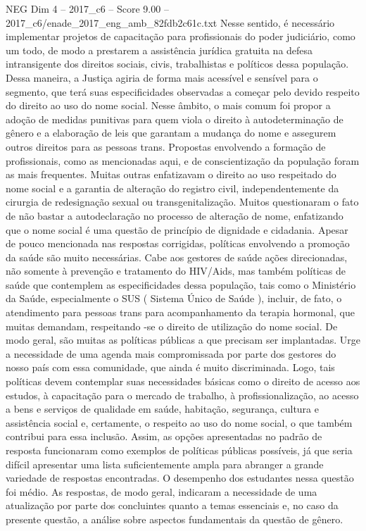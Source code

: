 \begin{textsample}{NEG Dim 4 – 2017\_c6 – Score 9.00 – 2017\_c6/enade\_2017\_eng\_amb\_82fdb2c61c.txt}
Nesse sentido, é necessário implementar projetos de capacitação para profissionais do poder judiciário, como um todo, de modo a prestarem a assistência jurídica gratuita na defesa intransigente dos direitos sociais, civis, trabalhistas e políticos dessa população.
Dessa maneira, a Justiça agiria de forma mais acessível e sensível para o segmento, que terá suas especificidades observadas a começar pelo devido respeito do direito ao uso do nome social.
Nesse âmbito, o mais comum foi propor a adoção de medidas punitivas para quem viola o direito à autodeterminação de gênero e a elaboração de leis que garantam a mudança do nome e assegurem outros direitos para as pessoas trans.
Propostas envolvendo a formação de profissionais, como as mencionadas aqui, e de conscientização da população foram as mais frequentes.
Muitas outras enfatizavam o direito ao uso respeitado do nome social e a garantia de alteração do registro civil, independentemente da cirurgia de redesignação sexual ou transgenitalização.
Muitos questionaram o fato de não bastar a autodeclaração no processo de alteração de nome, enfatizando que o nome social é uma questão de princípio de dignidade e cidadania.
Apesar de pouco mencionada nas respostas corrigidas, políticas envolvendo a promoção da saúde são muito necessárias.
Cabe aos gestores de saúde ações direcionadas, não somente à prevenção e tratamento do HIV/Aids, mas também políticas de saúde que contemplem as especificidades dessa população, tais como o Ministério da Saúde, especialmente o SUS ( Sistema Único de Saúde ), incluir, de fato, o atendimento para pessoas trans para acompanhamento da terapia hormonal, que muitas demandam, respeitando -se o direito de utilização do nome social.
De modo geral, são muitas as políticas públicas a que precisam ser implantadas.
Urge a necessidade de uma agenda mais compromissada por parte dos gestores do nosso país com essa comunidade, que ainda é muito discriminada.
Logo, tais políticas devem contemplar suas necessidades básicas como o direito de acesso aos estudos, à capacitação para o mercado de trabalho, à profissionalização, ao acesso a bens e serviços de qualidade em saúde, habitação, segurança, cultura e assistência social e, certamente, o respeito ao uso do nome social, o que também contribui para essa inclusão.
Assim, as opções apresentadas no padrão de resposta funcionaram como exemplos de políticas públicas possíveis, já que seria difícil apresentar uma lista suficientemente ampla para abranger a grande variedade de respostas encontradas.
O desempenho dos estudantes nessa questão foi médio.
As respostas, de modo geral, indicaram a necessidade de uma atualização por parte dos concluintes quanto a temas essenciais e, no caso da presente questão, a análise sobre aspectos fundamentais da questão de gênero.

\end{textsample}
